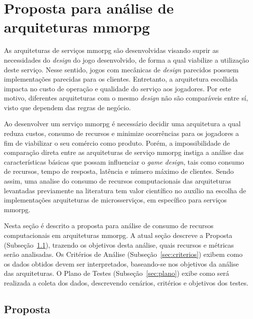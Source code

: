 \chapter{Proposta para análise de arquiteturas \ac{mmorpg}}
\label{cap3}



As arquiteturas de serviços \ac{mmorpg} são desenvolvidas visando suprir as necessidades do \textit{design} do jogo desenvolvido, de forma a qual viabilize a utilização deste serviço.
%
Nesse sentido, jogos com mecânicas de \textit{design} parecidos possuem implementações parecidas para os clientes.
%
Entretanto, a arquitetura escolhida impacta no custo de operação e qualidade do serviço aos jogadores.
%
Por este motivo, diferentes arquiteturas com o mesmo \textit{design} não são comparáveis entre sí, visto que dependem das regras de negócio.



Ao desenvolver um serviço \ac{mmorpg} é necessário decidir uma arquitetura a qual reduza custos, consumo de recursos e minimize ocorrências para os jogadores a fim de viabilizar o seu comércio como produto.
%
Porém, a impossibilidade de comparação direta entre as arquiteturas de serviço \ac{mmorpg} instiga a análise das características básicas que possam influenciar o \textit{game design}, tais como consumo de recursos, tempo de resposta, latência e número máximo de clientes.
%
Sendo assim, uma analise do consumo de recursos computacionais das arquiteturas levantadas previamente na literatura tem valor científico no auxílio na escolha de implementações arquiteturas de microsserviços, em específico para serviços \ac{mmorpg}.



Nesta seção é descrito a proposta para análise de consumo de recursos computacionais em arquiteturas \ac{mmorpg}.
%
A atual seção descreve a Proposta (Subseção~\ref{sec:proposta}), trazendo os objetivos desta análise, quais recursos e métricas serão analisadas.
%
Os Critérios de Análise (Subseção~\ref{sec:criterios}) exibem como os dados obtidos devem ser interpretados, baseando-se nos objetivos da análise das arquiteturas.
%
O Plano de Testes (Subseção~\ref{sec:plano}) exibe como será realizada a coleta dos dados, descrevendo cenários, critérios e objetivos dos testes.



\section{Proposta}
\label{sec:proposta}

